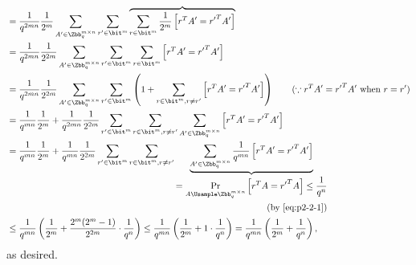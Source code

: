 \begin{answer}[ii]
\begin{align*}
        &= \frac{1}{q^{2mn}} \frac{1}{2^m} \sum_{A'\in  \Zbb_q^{m\times n}}\sum_{r'\in \bit^m}    \overbrace{\sum_{r\in\bit^{m}}\frac{1}{2^m}\left[ r^T A' = {r'}^TA'\right]}^{}\\
        &= \frac{1}{q^{2mn}} \frac{1}{2^{2m}} \sum_{A'\in  \Zbb_q^{m\times n}}\sum_{r'\in \bit^m}    \sum_{r\in\bit^{m}}\left[ r^T A' = {r'}^TA'\right]\\
        &= \frac{1}{q^{2mn}} \frac{1}{2^{2m}} \sum_{A'\in  \Zbb_q^{m\times n}}\sum_{r'\in \bit^m}  \left(1 + \sum_{r\in\bit^{m}, r\neq r'}\left[ r^T A' = {r'}^TA'\right]\right)
        \qquad (\because r^T A' = {r'}^TA' \textrm{ when } r=r')\\
        &= \frac{1}{q^{mn}} \frac{1}{2^{m}}+ \frac{1}{q^{2mn}} \frac{1}{2^{2m}} \sum_{r'\in \bit^m}  \sum_{r\in\bit^{m}, r\neq r'} \sum_{A'\in  \Zbb_q^{m\times n}} \left[ r^T A' = {r'}^TA'\right]\\
        &= \frac{1}{q^{mn}} \frac{1}{2^{m}}+ \frac{1}{q^{mn}} \frac{1}{2^{2m}} \sum_{r'\in \bit^m}  \sum_{r\in\bit^{m}, r\neq r'} \underbrace{\sum_{A'\in  \Zbb_q^{m\times n}}\frac{1}{q^{mn}} \left[ r^T A' = {r'}^TA'\right]}_{\begin{aligned}=\Pr_{A\Usample \Zbb_q^{m\times n}}\left[r^T A = {r'}^TA\right]\le\frac{1}{q^n} \\ \textrm{(by \eqref{eq:p2-2-1})}\end{aligned}}\\
        &\le \frac{1}{q^{mn}} \left( \frac{1}{2^m}+\frac{2^m(2^m-1)}{2^{2m}} \cdot \frac{1}{q^n} \right)
        \le \frac{1}{q^{mn}} \left( \frac{1}{2^m}+1 \cdot \frac{1}{q^n} \right)
        = \frac{1}{q^{mn}} \left( \frac{1}{2^m}+\frac{1}{q^n} \right),
    \end{align*}
    as desired.

\end{answer}

